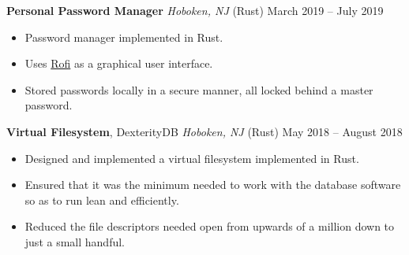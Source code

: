 \documentclass[10pt,letterpaper,roman]{moderncv}
\begin{document}
\hfill

\textbf{Personal Password Manager} \textit{Hoboken, NJ} (Rust) \hfill March 2019 -- July 2019
\begin{itemize}
\item Password manager implemented in Rust.
\item Uses \href{https://github.com/davatorium/rofi}{Rofi} as a graphical user interface.
\item Stored passwords locally in a secure manner, all locked behind a master password.
\end{itemize}

\hfill

\textbf{Virtual Filesystem}, DexterityDB \textit{Hoboken, NJ} (Rust) \hfill May 2018 -- August 2018
\begin{itemize}
\item Designed and implemented a virtual filesystem implemented in Rust.
\item Ensured that it was the minimum needed to work with the database software so as to run lean and efficiently.
\item Reduced the file descriptors needed open from upwards of a million down to just a small handful.
\end{itemize}
\end{document}
